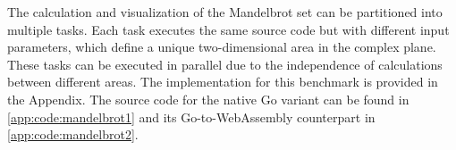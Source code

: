 The calculation and visualization of the Mandelbrot set can be partitioned into multiple tasks. Each task executes the same source code but with different input parameters, which define a unique two-dimensional area in the complex plane. These tasks can be executed in parallel due to the independence of calculations between different areas. The implementation for this benchmark is provided in the Appendix. The source code for the native Go variant can be found in \ref{app:code:mandelbrot1} and its Go-to-WebAssembly counterpart in \ref{app:code:mandelbrot2}.